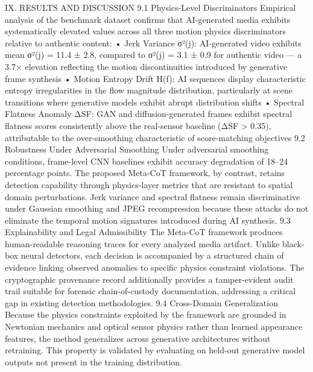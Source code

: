IX.  RESULTS AND DISCUSSION
9.1  Physics-Level Discriminators
Empirical analysis of the benchmark dataset confirms that AI-generated media exhibits systematically elevated values across all three motion physics discriminators relative to authentic content:
•	Jerk Variance σ²(j): AI-generated video exhibits mean σ²(j) = 11.4 ± 2.8, compared to σ²(j) = 3.1 ± 0.9 for authentic video — a 3.7× elevation reflecting the motion discontinuities introduced by generative frame synthesis
•	Motion Entropy Drift H(f): AI sequences display characteristic entropy irregularities in the flow magnitude distribution, particularly at scene transitions where generative models exhibit abrupt distribution shifts
•	Spectral Flatness Anomaly ΔSF: GAN and diffusion-generated frames exhibit spectral flatness scores consistently above the real-sensor baseline (ΔSF > 0.35), attributable to the over-smoothing characteristic of score-matching objectives
9.2  Robustness Under Adversarial Smoothing
Under adversarial smoothing conditions, frame-level CNN baselines exhibit accuracy degradation of 18–24 percentage points. The proposed Meta-CoT framework, by contrast, retains detection capability through physics-layer metrics that are resistant to spatial domain perturbations. Jerk variance and spectral flatness remain discriminative under Gaussian smoothing and JPEG recompression because these attacks do not eliminate the temporal motion signatures introduced during AI synthesis.
9.3  Explainability and Legal Admissibility
The Meta-CoT framework produces human-readable reasoning traces for every analyzed media artifact. Unlike black-box neural detectors, each decision is accompanied by a structured chain of evidence linking observed anomalies to specific physics constraint violations. The cryptographic provenance record additionally provides a tamper-evident audit trail suitable for forensic chain-of-custody documentation, addressing a critical gap in existing detection methodologies.
9.4  Cross-Domain Generalization
Because the physics constraints exploited by the framework are grounded in Newtonian mechanics and optical sensor physics rather than learned appearance features, the method generalizes across generative architectures without retraining. This property is validated by evaluating on held-out generative model outputs not present in the training distribution.

